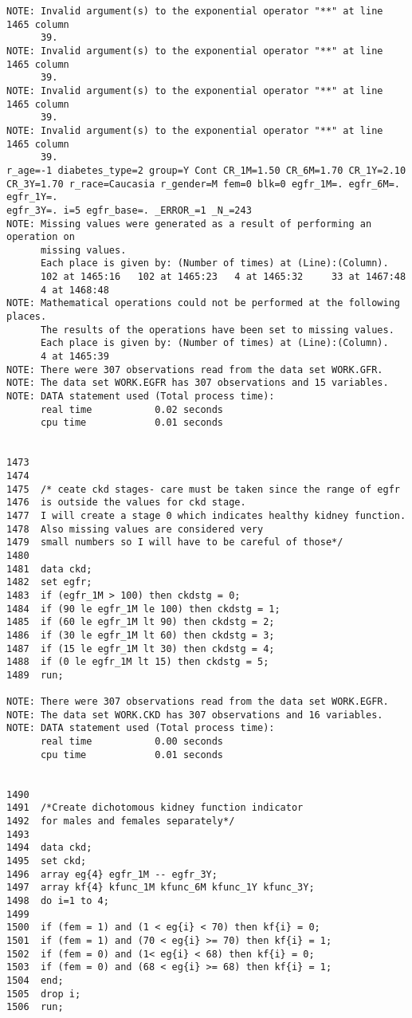 \documentclass{article}\usepackage[]{graphicx}\usepackage[]{color}
\begin{document}
\begin{verbatim}
NOTE: Invalid argument(s) to the exponential operator "**" at line 1465 column
      39.
NOTE: Invalid argument(s) to the exponential operator "**" at line 1465 column
      39.
NOTE: Invalid argument(s) to the exponential operator "**" at line 1465 column
      39.
NOTE: Invalid argument(s) to the exponential operator "**" at line 1465 column
      39.
r_age=-1 diabetes_type=2 group=Y Cont CR_1M=1.50 CR_6M=1.70 CR_1Y=2.10
CR_3Y=1.70 r_race=Caucasia r_gender=M fem=0 blk=0 egfr_1M=. egfr_6M=. egfr_1Y=.
egfr_3Y=. i=5 egfr_base=. _ERROR_=1 _N_=243
NOTE: Missing values were generated as a result of performing an operation on
      missing values.
      Each place is given by: (Number of times) at (Line):(Column).
      102 at 1465:16   102 at 1465:23   4 at 1465:32     33 at 1467:48
      4 at 1468:48
NOTE: Mathematical operations could not be performed at the following places.
      The results of the operations have been set to missing values.
      Each place is given by: (Number of times) at (Line):(Column).
      4 at 1465:39
NOTE: There were 307 observations read from the data set WORK.GFR.
NOTE: The data set WORK.EGFR has 307 observations and 15 variables.
NOTE: DATA statement used (Total process time):
      real time           0.02 seconds
      cpu time            0.01 seconds


1473
1474
1475  /* ceate ckd stages- care must be taken since the range of egfr
1476  is outside the values for ckd stage.
1477  I will create a stage 0 which indicates healthy kidney function.
1478  Also missing values are considered very
1479  small numbers so I will have to be careful of those*/
1480
1481  data ckd;
1482  set egfr;
1483  if (egfr_1M > 100) then ckdstg = 0;
1484  if (90 le egfr_1M le 100) then ckdstg = 1;
1485  if (60 le egfr_1M lt 90) then ckdstg = 2;
1486  if (30 le egfr_1M lt 60) then ckdstg = 3;
1487  if (15 le egfr_1M lt 30) then ckdstg = 4;
1488  if (0 le egfr_1M lt 15) then ckdstg = 5;
1489  run;

NOTE: There were 307 observations read from the data set WORK.EGFR.
NOTE: The data set WORK.CKD has 307 observations and 16 variables.
NOTE: DATA statement used (Total process time):
      real time           0.00 seconds
      cpu time            0.01 seconds


1490
1491  /*Create dichotomous kidney function indicator
1492  for males and females separately*/
1493
1494  data ckd;
1495  set ckd;
1496  array eg{4} egfr_1M -- egfr_3Y;
1497  array kf{4} kfunc_1M kfunc_6M kfunc_1Y kfunc_3Y;
1498  do i=1 to 4;
1499
1500  if (fem = 1) and (1 < eg{i} < 70) then kf{i} = 0;
1501  if (fem = 1) and (70 < eg{i} >= 70) then kf{i} = 1;
1502  if (fem = 0) and (1< eg{i} < 68) then kf{i} = 0;
1503  if (fem = 0) and (68 < eg{i} >= 68) then kf{i} = 1;
1504  end;
1505  drop i;
1506  run;


\end{verbatim}
\end{document}
